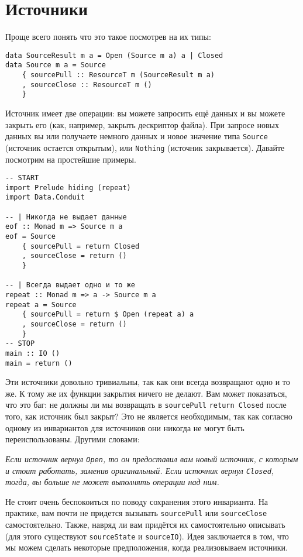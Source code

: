 \section{Источники}

Проще всего понять что это такое посмотрев на их типы:
\begin{lstlisting}
data SourceResult m a = Open (Source m a) a | Closed
data Source m a = Source
    { sourcePull :: ResourceT m (SourceResult m a)
    , sourceClose :: ResourceT m ()
    }
\end{lstlisting}
Источник имеет две операции: вы можете запросить ещё данных и вы можете закрыть его (как,
например, закрыть дескриптор файла). При запросе новых данных вы или получаете немного
данных и новое  значение типа \lstinline=Source= (источник остается открытым), или
\lstinline=Nothing= (источник закрывается). Давайте посмотрим на простейшие примеры.
\begin{lstlisting}
-- START
import Prelude hiding (repeat)
import Data.Conduit

-- | Никогда не выдает данные
eof :: Monad m => Source m a
eof = Source
    { sourcePull = return Closed
    , sourceClose = return ()
    }

-- | Всегда выдает одно и то же
repeat :: Monad m => a -> Source m a
repeat a = Source
    { sourcePull = return $ Open (repeat a) a
    , sourceClose = return ()
    }
-- STOP
main :: IO ()
main = return ()
\end{lstlisting}
Эти источники довольно тривиальны, так как они всегда возвращают одно и то же. К тому
же их функции закрытия ничего не делают. Вам может показаться, что это баг: не должны ли 
мы возвращать в \lstinline=sourcePull= \verb=return Closed= после того, как источник был
закрыт? Это не является необходимым, так как согласно одному из инвариантов для
источников они никогда не могут быть переиспользованы. Другими словами:
    
\textit{Если источник вернул \lstinline=Open=, то он предоставил вам новый источник, с
которым и
стоит работать, заменив оригинальный. Если источник вернул \lstinline=Closed=, тогда, вы
больше не может выполнять операции над ним.}
    
Не стоит очень беспокоиться по поводу сохранения этого инварианта. На практике, вам почти
не придется вызывать \lstinline=sourcePull= или \lstinline=sourceClose= самостоятельно.
Также, навряд ли вам придётся их самостоятельно описывать (для этого существуют
\lstinline=sourceState= и \lstinline=sourceIO=).
Идея заключается в том, что мы можем сделать некоторые предположения, когда реализовываем
источники.

